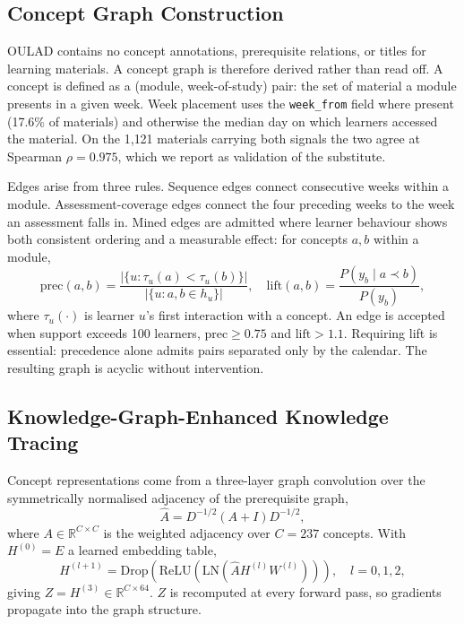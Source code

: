 \documentclass[conference]{IEEEtran}
\begin{document}
\subsection{Concept Graph Construction}

OULAD contains no concept annotations, prerequisite relations, or titles for learning
materials. A concept graph is therefore derived rather than read off. A concept is
defined as a (module, week-of-study) pair: the set of material a module presents in a
given week. Week placement uses the \texttt{week\_from} field where present (17.6\% of
materials) and otherwise the median day on which learners accessed the material. On the
1{,}121 materials carrying both signals the two agree at Spearman $\rho = 0.975$, which
we report as validation of the substitute.

Edges arise from three rules. Sequence edges connect consecutive weeks within a module.
Assessment-coverage edges connect the four preceding weeks to the week an assessment
falls in. Mined edges are admitted where learner behaviour shows both consistent ordering
and a measurable effect: for concepts $a, b$ within a module,
%
\begin{equation}
\mathrm{prec}(a,b) = \frac{\left|\{u : \tau_u(a) < \tau_u(b)\}\right|}{\left|\{u : a, b \in h_u\}\right|},
\quad
\mathrm{lift}(a,b) = \frac{P(y_b \mid a \prec b)}{P(y_b)},
\label{eq:mining}
\end{equation}
%
where $\tau_u(\cdot)$ is learner $u$'s first interaction with a concept. An edge is
accepted when support exceeds 100 learners, $\mathrm{prec} \geq 0.75$ and
$\mathrm{lift} > 1.1$. Requiring lift is essential: precedence alone admits pairs
separated only by the calendar. The resulting graph is acyclic without intervention.

\subsection{Knowledge-Graph-Enhanced Knowledge Tracing}

Concept representations come from a three-layer graph convolution over the symmetrically
normalised adjacency of the prerequisite graph,
%
\begin{equation}
\hat{A} = D^{-1/2}(A + I)D^{-1/2},
\label{eq:adjacency}
\end{equation}
%
where $A \in \mathbb{R}^{C \times C}$ is the weighted adjacency over $C = 237$ concepts.
With $H^{(0)} = E$ a learned embedding table,
%
\begin{equation}
H^{(l+1)} = \mathrm{Drop}\!\left(\mathrm{ReLU}\!\left(\mathrm{LN}\!\left(\hat{A} H^{(l)} W^{(l)}\right)\right)\right), \quad l = 0,1,2,
\label{eq:gcn}
\end{equation}
%
giving $Z = H^{(3)} \in \mathbb{R}^{C \times 64}$. $Z$ is recomputed at every forward
pass, so gradients propagate into the graph structure.
\end{document}
